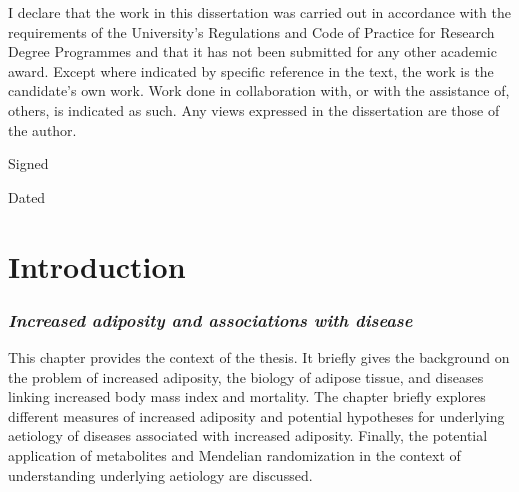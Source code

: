 \documentclass[11pt,twoside]{bristolthesis}
\begin{document}
  \begin{declaration}
    I declare that the work in this dissertation was carried out in accordance with the requirements of the University's Regulations and Code of Practice for Research Degree Programmes and that it has not been submitted for any other academic award. Except where indicated by specific reference in the text, the work is the candidate's own work. Work done in collaboration with, or with the assistance of, others, is indicated as such. Any views expressed in the dissertation are those of the author.
    
    \bigskip
    \bigskip
    \bigskip
    \bigskip
    \bigskip
    
    Signed
    
    \bigskip
    \bigskip
    \bigskip
    \bigskip
    \bigskip
    
    Dated\\
  \end{declaration}
  \hypersetup{linkcolor=black}
  \setcounter{tocdepth}{1}
  \tableofcontents

  \listoftables

  \listoffigures

\mainmatter %
\pagestyle{plain}

\hypertarget{chapter1}{%
\chapter{Introduction}\label{chapter1}}

\hypertarget{increased-adiposity-and-associations-with-disease}{%
\subsection*{\texorpdfstring{\emph{Increased adiposity and associations with disease}}{Increased adiposity and associations with disease}}\label{increased-adiposity-and-associations-with-disease}}

This chapter provides the context of the thesis. It briefly gives the background on the problem of increased adiposity, the biology of adipose tissue, and diseases linking increased body mass index and mortality. The chapter briefly explores different measures of increased adiposity and potential hypotheses for underlying aetiology of diseases associated with increased adiposity. Finally, the potential application of metabolites and Mendelian randomization in the context of understanding underlying aetiology are discussed.
\end{document}
